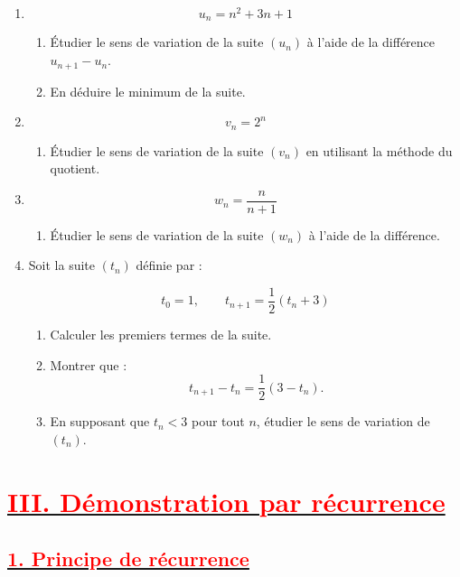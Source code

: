 \documentclass[12pt,a4paper]{article}
\begin{document}
\begin{enumerate}
    \item 
    \[
    u_n=n^2+3n+1
    \]
    
    \begin{enumerate}
        \item Étudier le sens de variation de la suite $\left(u_n\right)$ à l'aide de la différence $u_{n+1}-u_n$.
        \item En déduire le minimum de la suite.
    \end{enumerate}

    \item 
    \[
    v_n=2^n
    \]
    
    \begin{enumerate}
        \item Étudier le sens de variation de la suite $\left(v_n\right)$ en utilisant la méthode du quotient.
    \end{enumerate}

    \item 
    \[
    w_n=\frac{n}{n+1}
    \]
    
    \begin{enumerate}
        \item Étudier le sens de variation de la suite $\left(w_n\right)$ à l'aide de la différence.
    \end{enumerate}

    \item 
    Soit la suite $\left(t_n\right)$ définie par :
    
    \[
    t_0=1,\qquad t_{n+1}=\frac{1}{2}(t_n+3)
    \]
    
    \begin{enumerate}
        \item Calculer les premiers termes de la suite.
        \item Montrer que :
        \[
        t_{n+1}-t_n=\frac{1}{2}(3-t_n).
        \]
        \item En supposant que $t_n<3$ pour tout $n$, étudier le sens de variation de $\left(t_n\right)$.
    \end{enumerate}
\end{enumerate}

\section*{\underline{\textbf{\textcolor{red}{III. Démonstration par récurrence}}}}

\subsection*{\underline{\textbf{\textcolor{red}{1. Principe de récurrence}}}}
\end{document}
